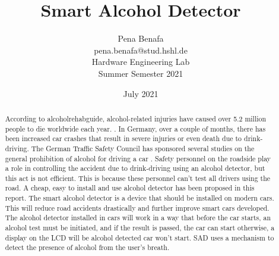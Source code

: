 \documentclass[12pt]{article}
\title{%
  \Huge Smart Alcohol Detector}
\author{Pena Benafa\\pena.benafa@stud.hshl.de\\
  \large Hardware Engineering Lab\\
  \large Summer Semester 2021}
\date{July 2021}
\begin{document}
\maketitle
\begin{figure}[htbp]

\label{fig}
\end{figure}

\begin{abstract}
   According to alcoholrehabguide, alcohol-related injuries have caused over 5.2 million people to die worldwide each year. \cite{a1}. In Germany, over a couple of months, there has been increased car crashes that result in severe injuries or even death due to drink-driving. The German Traffic Safety Council has sponsored several studies on the general prohibition of alcohol for driving a car \cite{a2}. Safety personnel on the roadside play a role in controlling the accident due to drink-driving using an alcohol detector, but this act is not efficient. This is because these personnel can't test all drivers using the road. A cheap, easy to install and use alcohol detector has been proposed in this report. The smart alcohol detector is a device that should be installed on modern cars. This will reduce road accidents drastically and further improve smart cars developed. The alcohol detector installed in cars will work in a way that before the car starts, an alcohol test must be initiated, and if the result is passed, the car can start otherwise, a display on the LCD will be alcohol detected car won't start. SAD uses a mechanism to detect the presence of alcohol from the user's breath.
\end{abstract}
\end{document}

